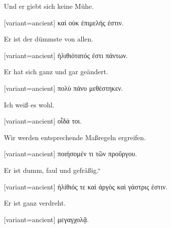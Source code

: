 Und er giebt sich keine Mühe. 

\switchcolumn

\begin{greek}[variant=ancient]%
καὶ οὐκ ἐπιμελής ἐστιν.

\end{greek}%
\switchcolumn*

Er ist der dümmste von allen. 

\switchcolumn

\begin{greek}[variant=ancient]%
ἠλιθιότατός ἐστι πάντων.

\end{greek}%
\switchcolumn*

Er hat sich ganz und gar geändert. 

\switchcolumn

\begin{greek}[variant=ancient]%
πολὺ πάνυ μεθέστηκεν.

\end{greek}%
\switchcolumn*

Ich weiß es wohl. 

\switchcolumn

\begin{greek}[variant=ancient]%
οἶδά τοι.

\end{greek}%
\switchcolumn*

Wir werden entsprechende Maßregeln ergreifen. 

\switchcolumn

\begin{greek}[variant=ancient]%
ποιήσομέν τι τῶν προὔργου.

\end{greek}%
\switchcolumn*

Er ist \quotedblbase dumm, faul und gefräßig.``

\switchcolumn

\begin{greek}[variant=ancient]%
ἠλίθιός τε καὶ ἀργὸς καὶ γάστρις ἐστιν.

\end{greek}%
\switchcolumn*

Er ist ganz verdreht. 

\switchcolumn

\begin{greek}[variant=ancient]%
μεγαγχολᾷ.

\end{greek}%
\switchcolumn*

